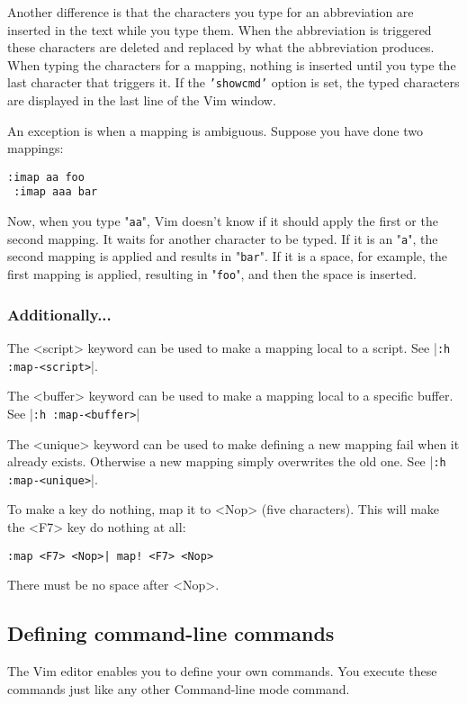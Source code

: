 Another difference is that the characters you type for an abbreviation are inserted in the text while you type them.
When the abbreviation is triggered these characters are deleted and replaced by what the abbreviation produces.
When typing the characters for a mapping, nothing is inserted until you type the last character that triggers it.
If the \texttt{'showcmd'} option is set, the typed characters are displayed in the last line of the Vim window.

An exception is when a mapping is ambiguous.
Suppose you have done two mappings:

\begin{Verbatim}[samepage=true]
 :imap aa foo
 :imap aaa bar
\end{Verbatim}

Now, when you type "\texttt{aa}", Vim doesn't know if it should apply the first or the second mapping.
It waits for another character to be typed.
If it is an "\texttt{a}", the second mapping is applied and results in "\texttt{bar}".
If it is a space, for example, the first mapping is applied, resulting in "\texttt{foo}", and then the space is inserted.

\subsubsection{Additionally...}
The <script> keyword can be used to make a mapping local to a script.
See |\texttt{:h :map-<script>}|.

The <buffer> keyword can be used to make a mapping local to a specific buffer.
See |\texttt{:h :map-<buffer>}|

The <unique> keyword can be used to make defining a new mapping fail when it already exists.
Otherwise a new mapping simply overwrites the old one.
See |\texttt{:h :map-<unique>}|.

To make a key do nothing, map it to <Nop> (five characters).
This will make the <F7> key do nothing at all:

\begin{Verbatim}[samepage=true]
 :map <F7> <Nop>| map! <F7> <Nop>
\end{Verbatim}

There must be no space after <Nop>.
\subsection{Defining command-line commands}
The Vim editor enables you to define your own commands.
You execute these commands just like any other Command-line mode command.

